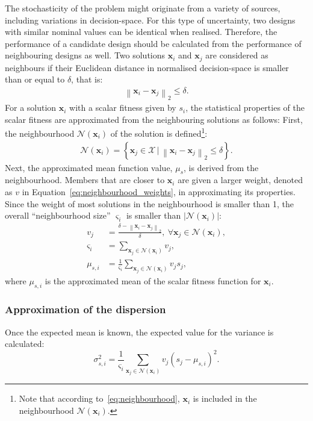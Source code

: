 \documentclass{llncs}
\newcommand{\brr}[1]{{\left({#1}\right)}} %
\newcommand{\brf}[1]{\left\lbrace{#1}\right\rbrace} %
\newcommand{\brabs}[1]{\left\vert{#1}\right\vert} %
\newcommand{\norm}[2]{\left\|{#1}\right\|_{#2}} %
\newcommand{\vx}{\mathbf{x}} %
\newcommand{\NSet}{\mathcal{N}} %
\newcommand{\XSet}{\mathcal{X}} %
\begin{document}
The stochasticity of the problem might originate from a variety of sources, including variations in decision-space. For this type of uncertainty, two designs with similar nominal values can be identical when realised. Therefore, the performance of a candidate design should be calculated from the performance of neighbouring designs as well. Two solutions $\vx_i$ and $\vx_j$ are considered as neighbours if their Euclidean distance in normalised decision-space is smaller than or equal to $\delta$, that is:
\begin{align}
\norm{\vx_i-\vx_j}{2}\leq\delta.
\end{align}
For a solution $\vx_i$ with a scalar fitness given by $s_i$, the statistical properties of the scalar fitness are approximated from the neighbouring solutions as follows:
First, the neighbourhood $\NSet(\vx_i)$ of the solution is defined\footnote{Note that according to~\eqref{eq:neighbourhood}, $\vx_i$ is included in the neighbourhood $\NSet(\vx_i)$.}:
\begin{align}
\NSet(\vx_i)=\brf{\vx_j\in \XSet \,\vert \,\norm{\vx_i-\vx_j}{2}\leq\delta}.
\label{eq:neighbourhood}
\end{align}
Next, the approximated mean function value, $\mu_s$, is derived from the neighbourhood.
Members that are closer to $\vx_i$ are given a larger weight, denoted as $v$ in Equation~\eqref{eq:neighbourhood_weights}, in approximating its properties.
Since the weight of most solutions in the neighbourhood is smaller than 1, the overall ``neighbourhood size'' $\varsigma_i$ is smaller than $\brabs{\NSet(\vx_i)}$:
\begin{align}
\label{eq:neighbourhood_weights}
v_j &= \frac{\delta-\norm{\vx_i-\vx_j}{2}}{\delta}, ~\forall \vx_j\in\NSet(\vx_i),\\
\label{eq:neighbourhood_size}
\varsigma_i &= \sum_{\vx_j\in\NSet(\vx_i)} v_j,\\
\label{eq:neighbourhood_mean}
\mu_{s,i} &= \frac{1}{\varsigma_i}  \sum_{\vx_j\in\NSet(\vx_i)} v_j s_j,
\end{align}
where $\mu_{s,i}$ is the approximated mean of the scalar fitness function for $\vx_i$.

\subsubsection{Approximation of the dispersion}

Once the expected mean is known, the expected value for the variance is calculated:
\begin{equation}
\sigma_{s,i}^2 = \frac{1}{\varsigma_i} \sum_{\vx_j\in\NSet(\vx_i)} v_j \brr{s_j - \mu_{s,i}}^2 .
\label{eq:neighbourhood_variance}
\end{equation}
\end{document}
